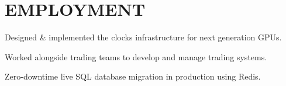 \documentclass[]{deedy-resume-openfont}
\begin{document}
\hfill
\begin{minipage}[t]{0.66\textwidth} 


\section{EMPLOYMENT}
\vspace{\topsep} %
\begin{tightemize}
\item Designed \& implemented the clocks infrastructure for next generation  GPUs.
\end{tightemize}
\sectionsep %
\begin{tightemize}
\item Worked alongside trading teams to develop and manage trading systems.
\end{tightemize}
\sectionsep %
\begin{tightemize}
\item Zero-downtime live SQL database migration in production using Redis.
\end{tightemize}

\end{minipage}
\end{document}
